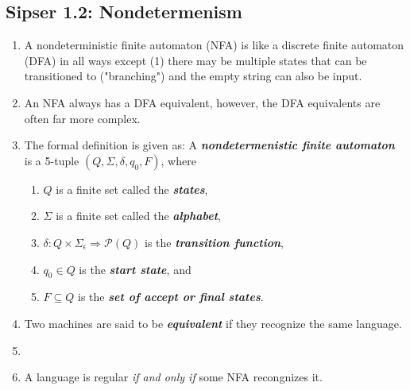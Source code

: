 \documentclass{article}
\begin{document}
\subsection{Sipser 1.2: Nondetermenism}
\begin{enumerate}
    \item A nondeterministic finite automaton (NFA) is like a discrete finite automaton (DFA) in all ways except (1) there may be multiple states that can be transitioned to ("branching") and the empty string can also be input.
    \item An NFA always has a DFA equivalent, however, the DFA equivalents are often far more complex.
    \item The formal definition is given as: A \textbf{\textit{ nondetermenistic finite automaton}} is a 5-tuple $(Q,\Sigma,\delta,q_0,F)$, where 
    \begin{enumerate}
        \item $Q$ is a finite set called the \textbf{\textit{states}},
        \item $\Sigma$ is a finite set called the \textbf{\textit{alphabet}},
        \item $\delta: Q \times \Sigma_\epsilon \Rightarrow \mathcal{P}(Q)$ is the \textbf{\textit{transition function}},
        \item $q_0 \in Q$ is the \textbf{\textit{start state}}, and
        \item $F \subseteq Q$ is the \textbf{\textit{set of accept or final states}}.
    \end{enumerate}
    \item Two machines are said to be \textbf{\textit{equivalent}} if they recognize the same language.
    \item \item A language is regular \textit{if and only if} some NFA recongnizes it.
\end{enumerate}
\end{document}

